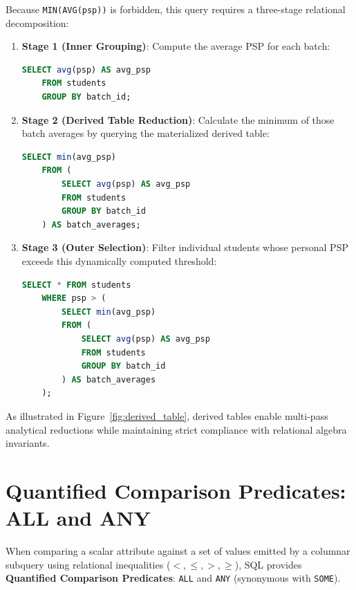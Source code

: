 \documentclass[10pt,twocolumn,letterpaper]{article}
\begin{document}
Because \texttt{MIN(AVG(psp))} is forbidden, this query requires a three-stage relational decomposition:
\begin{enumerate}
    \item \textbf{Stage 1 (Inner Grouping)}: Compute the average PSP for each batch:
    \begin{lstlisting}[language=SQL]
    SELECT avg(psp) AS avg_psp 
    FROM students 
    GROUP BY batch_id;
    \end{lstlisting}
    \item \textbf{Stage 2 (Derived Table Reduction)}: Calculate the minimum of those batch averages by querying the materialized derived table:
    \begin{lstlisting}[language=SQL]
    SELECT min(avg_psp) 
    FROM (
        SELECT avg(psp) AS avg_psp 
        FROM students 
        GROUP BY batch_id
    ) AS batch_averages;
    \end{lstlisting}
    \item \textbf{Stage 3 (Outer Selection)}: Filter individual students whose personal PSP exceeds this dynamically computed threshold:
    \begin{lstlisting}[language=SQL]
    SELECT * FROM students
    WHERE psp > (
        SELECT min(avg_psp) 
        FROM (
            SELECT avg(psp) AS avg_psp 
            FROM students 
            GROUP BY batch_id
        ) AS batch_averages
    );
    \end{lstlisting}
\end{enumerate}

As illustrated in Figure~\ref{fig:derived_table}, derived tables enable multi-pass analytical reductions while maintaining strict compliance with relational algebra invariants.

\section{Quantified Comparison Predicates: ALL and ANY}
\label{sec:quantified_predicates}

When comparing a scalar attribute against a set of values emitted by a columnar subquery using relational inequalities ($<, \le, >, \ge$), SQL provides \textbf{Quantified Comparison Predicates}: \texttt{ALL} and \texttt{ANY} (synonymous with \texttt{SOME}).
\end{document}
